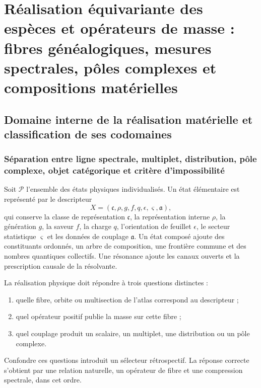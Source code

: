 
\chapter{Réalisation équivariante des espèces et opérateurs de masse : fibres généalogiques, mesures spectrales, pôles complexes et compositions matérielles}
\label{hmtmasscl:chap-realizacion-equiv}

\section{Domaine interne de la réalisation matérielle et classification de ses codomaines}

\subsection{Séparation entre ligne spectrale, multiplet, distribution, pôle complexe, objet catégorique et critère d'impossibilité}

Soit \(\mathcal P\) l'ensemble des états physiques individualisés. Un état
élémentaire est représenté par le descripteur
\[
 X=(\mathfrak c,\rho,g,f,q,\epsilon,\varsigma,\mathfrak a),
\]
qui conserve la classe de représentation \(\mathfrak c\), la représentation interne
\(\rho\), la génération \(g\), la saveur \(f\), la charge \(q\), l'orientation de feuillet
\(\epsilon\), le secteur statistique \(\varsigma\) et les données de couplage
\(\mathfrak a\). Un état composé ajoute des constituants ordonnés, un arbre de
composition, une frontière commune et des nombres quantiques collectifs. Une résonance
ajoute les canaux ouverts et la prescription causale de la résolvante.

La réalisation physique doit répondre à trois questions distinctes :

\begin{enumerate}
\item quelle fibre, orbite ou multisection de l'atlas correspond au descripteur ;
\item quel opérateur positif publie la masse sur cette fibre ;
\item quel couplage produit un scalaire, un multiplet, une distribution ou
      un pôle complexe.
\end{enumerate}

Confondre ces questions introduit un sélecteur rétrospectif. La réponse
correcte s'obtient par une relation naturelle, un opérateur de fibre et une
compression spectrale, dans cet ordre.

